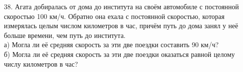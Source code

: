 38. Агата добиралась от дома до института на своём автомобиле с постоянной скоростью 100 км/ч. Обратно она ехала с постоянной скоростью, которая измерялась целым числом километров в час, причём путь до дома занял у неё больше времени, чем путь до института.\\
а) Могла ли её средняя скорость за эти две поездки составить 90 км/ч?\\
б) Могла ли её средняя скорость за эти две поездки оказаться равной целому числу километров в час?\\
